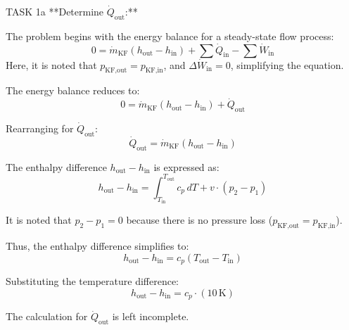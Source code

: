TASK 1a  
**Determine \( \dot{Q}_{\text{out}} \):**  

The problem begins with the energy balance for a steady-state flow process:  
\[
0 = \dot{m}_{\text{KF}} \left( h_{\text{out}} - h_{\text{in}} \right) + \sum \dot{Q}_{\text{in}} - \sum \dot{W}_{\text{in}}
\]  
Here, it is noted that \( p_{\text{KF,out}} = p_{\text{KF,in}} \), and \( \Delta \dot{W}_{\text{in}} = 0 \), simplifying the equation.  

The energy balance reduces to:  
\[
0 = \dot{m}_{\text{KF}} \left( h_{\text{out}} - h_{\text{in}} \right) + \dot{Q}_{\text{out}}
\]  

Rearranging for \( \dot{Q}_{\text{out}} \):  
\[
\dot{Q}_{\text{out}} = \dot{m}_{\text{KF}} \left( h_{\text{out}} - h_{\text{in}} \right)
\]  

The enthalpy difference \( h_{\text{out}} - h_{\text{in}} \) is expressed as:  
\[
h_{\text{out}} - h_{\text{in}} = \int_{T_{\text{in}}}^{T_{\text{out}}} c_p \, dT + v \cdot (p_2 - p_1)
\]  

It is noted that \( p_2 - p_1 = 0 \) because there is no pressure loss (\( p_{\text{KF,out}} = p_{\text{KF,in}} \)).  

Thus, the enthalpy difference simplifies to:  
\[
h_{\text{out}} - h_{\text{in}} = c_p \left( T_{\text{out}} - T_{\text{in}} \right)
\]  

Substituting the temperature difference:  
\[
h_{\text{out}} - h_{\text{in}} = c_p \cdot (10 \, \text{K})
\]  

The calculation for \( \dot{Q}_{\text{out}} \) is left incomplete.